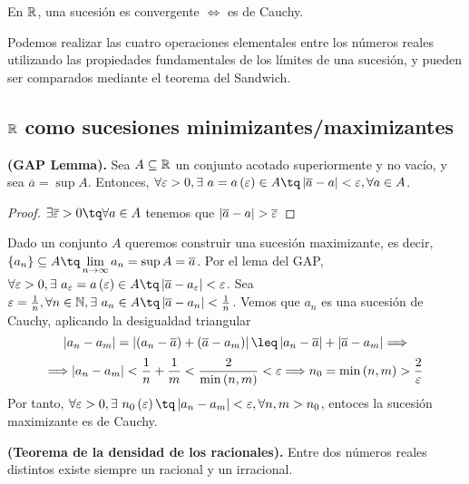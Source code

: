 \begin{coro}
    En $\mathbb{R}$, una sucesión es convergente $\iff$ es de Cauchy.
\end{coro}

Podemos realizar las cuatro operaciones elementales entre los números reales utilizando las propiedades fundamentales de los límites de una sucesión, y pueden ser comparados mediante el teorema del Sandwich.

\subsection{$\mathbb{R}$ como sucesiones minimizantes/maximizantes}
\begin{lemma}
    \textbf{(GAP Lemma).} Sea $A\subseteq\mathbb{R}$ un conjunto acotado superiormente y no vacío, y sea $\overline{a} = \sup A$. Entonces, $\forall\epsilon > 0, \exists\ a = a\left( \epsilon \right) \in A\tq \abs{\overline{a} - a} < \epsilon, \forall a\in A$.
\end{lemma}

\begin{proof}
    $\exists\overline{\epsilon} > 0 \tq \forall a\in A$ tenemos que $\left\vert \overline{a} - a \right\vert > \overline{\varepsilon}$
\end{proof}

Dado un conjunto $A$ queremos construir una sucesión maximizante, es decir, $\{a_n\}\subseteq A \tq \lim_{n\to\infty}a_n = \sup A = \overline{a}$. Por el lema del GAP, $\forall\epsilon > 0, \exists\ a_\epsilon = a\left( \epsilon \right) \in A\tq \abs{\overline{a} - a_\epsilon} < \epsilon$. Sea $\epsilon = \frac{1}{n}, \forall n\in\N, \exists\ a_n\in A\tq \abs{\overline{a} - a_n} < \frac{1}{n}$. Vemos que $a_n$ es una sucesión de Cauchy, aplicando la desigualdad triangular
\begin{equation}
    \abs{a_n - a_m} = \abs{\left( a_n - \overline{a} \right)  + \left( \overline{a} - a_m \right) }\leq \abs{a_n - \overline{a}} + \abs{\overline{a} - a_m} \implies
\end{equation}
\begin{equation}
    \Longrightarrow \left\vert a_n - a_m \right\vert < \frac{1}{n} + \frac{1}{m} < \frac{2}{\min\left( n, m \right) } < \varepsilon \Longrightarrow n_0 = \min\left( n, m \right) > \frac{2}{\varepsilon}
\end{equation}
Por tanto, $\forall\epsilon > 0, \exists\ n_0\left( \epsilon \right) \tq \abs{a_n - a_m} < \epsilon, \forall n, m > n_0$, entoces la sucesión maximizante es de Cauchy.

\begin{theorem}
    \textbf{(Teorema de la densidad de los racionales).} Entre dos números reales distintos existe siempre un racional y un irracional.
\end{theorem}
